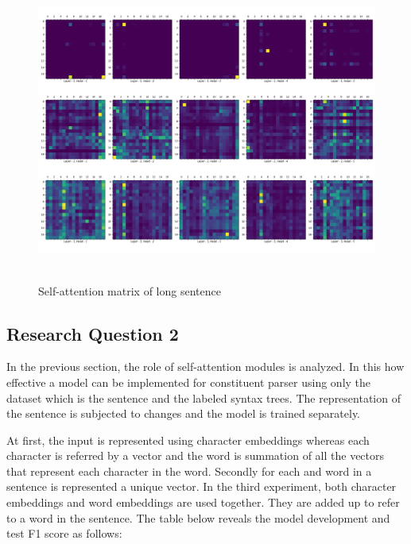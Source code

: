 \documentclass[a4paper, 11pt]{article}
\begin{document}
\begin{figure}[H]
    \centering
    \includegraphics[width=\textwidth,height=10cm,keepaspectratio=true]
    {self-attention-matrix-2.png}
    \caption{
        Self-attention matrix of long sentence
    }
    \label{fig:self-attention-matrix-large-sentence}
\end{figure}


\subsection{Research Question 2}

In the previous section, the role of self-attention modules is analyzed. In this how effective a model can be implemented for constituent parser using only the dataset which is the sentence and the labeled syntax trees. The representation of the sentence is subjected to changes and the model is trained separately. 

At first, the input is represented using character embeddings whereas each character is referred by a vector and the word is summation of all the vectors that represent each character in the word. Secondly for each and word in a sentence is represented a unique vector. In the third experiment, both character embeddings and word embeddings are used together. They are added up to refer to a word in the sentence. The table below reveals the model development and test F1 score as follows:
\end{document}
